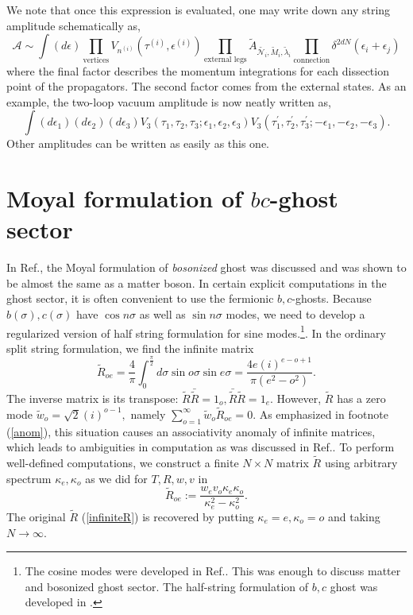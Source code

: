 \documentclass[a4paper,11pt]{article}
\begin{document}
We note that once this expression is evaluated, one may write down any
string amplitude schematically as,
\begin{equation}
\mathcal{A}\sim \int (d\epsilon) \prod_{\mathrm{vertices}}V_{n^{(i)}}(\tau
^{(i)},\epsilon ^{(i)})\prod_{\mathrm{external\,\,legs}}\!\tilde{A}_{\tilde{\mathcal{N}_i},\tilde{M}_i,\tilde{\lambda}_i}\prod_{\mathrm{connection}%
}\!\delta^{2dN}(\epsilon _{i}+\epsilon _{j})
\end{equation}%
where the final factor describes the momentum integrations for each
dissection point of the propagators. The second factor comes from the
external states. As an example, the two-loop vacuum amplitude is now neatly
written as,
\begin{equation}
\int (d\epsilon _{1})(d\epsilon _{2})(d\epsilon _{3})V_{3}(\tau _{1},\tau
_{2},\tau _{3};\epsilon _{1},\epsilon _{2},\epsilon _{3})V_{3}(\tau
_{1}^{\prime },\tau _{2}^{\prime },\tau _{3}^{\prime };-\epsilon
_{1},-\epsilon _{2},-\epsilon _{3}).
\end{equation}%
Other amplitudes can be written as easily as this one.

\section{Moyal formulation of $bc$-ghost sector}

In Ref.\cite{BM2}, the Moyal formulation of \textit{bosonized} ghost was
discussed and was shown to be almost the same as a matter boson. In certain
explicit computations in the ghost sector, it is often convenient to use the
fermionic $b,c$-ghosts. Because $b(\sigma ),c(\sigma )$ have $\cos n\sigma $
as well as $\sin n\sigma $ modes, we need to develop a regularized version
of half string formulation for sine modes.\footnote{%
The cosine modes were developed in Ref.\cite{BM1}\cite{BM2}. This was enough
to discuss matter and bosonized ghost sector. The half-string formulation of
$b,c$ ghost was developed in \cite{Bord}.}. In the ordinary split string
formulation, we find the infinite matrix
\begin{equation}
{\tilde{R}}_{oe}={\frac{4}{\pi }}\int_{0}^{\frac{\pi }{2}}d\sigma \sin
o\sigma \sin e\sigma ={\frac{4e(i)^{e-o+1}}{\pi (e^{2}-o^{2})}}.
\label{infiniteR}
\end{equation}%
The inverse matrix is its transpose: ${\tilde{R}}\bar{\tilde{R}}=1_o,\bar{\tilde{R}}{\tilde{R}}=1_e$. However, ${\tilde{R}}$ has a zero mode $\tilde{w}_{o}=%
\sqrt{2}(i)^{o-1},$ namely $\sum_{o=1}^{\infty }\tilde{w}_{o}{\tilde{R}}%
_{oe}=0$. As emphasized in footnote (\ref{anom}), this situation causes an
associativity anomaly of infinite matrices, which leads to ambiguities in
computation as was discussed in Ref.\cite{BM1}. To perform well-defined
computations, we construct a finite $N\times N$ matrix ${\tilde{R}}$ using
arbitrary spectrum $\kappa _{e},\kappa _{o}$ as we did for $T,R,w,v$ in \cite%
{BM2}
\begin{equation}
{\tilde{R}}_{oe}:={\frac{w_{e}v_{o}\kappa _{e}\kappa _{o}}{\kappa
_{e}^{2}-\kappa _{o}^{2}}}.
\end{equation}%
The original $\tilde{R}$ (\ref{infiniteR}) is recovered by putting $\kappa
_{e}=e,\kappa _{o}=o$ and taking $N\rightarrow \infty $.
\end{document}
